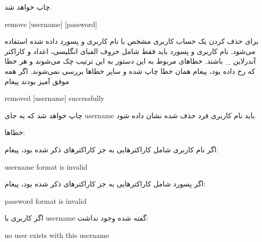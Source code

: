 \documentclass[]{article}
\begin{document}
چاپ خواهد شد.

\hrulefill




\begin{tcolorbox}[boxrule=0pt]
	\begin{latin}
  	  \large{
  	  	remove [username] [password]
		}
	\end{latin}
\end{tcolorbox}

برای حذف کردن یک حساب کاربری مشخص با نام کاربری و پسورد داده شده استفاده می‌شود. نام کاربری و پسورد باید فقط شامل حروف الفبای انگلیسی، اعداد و کاراکتر آندرلاین \_ باشند. خطاهای مربوط به این دستور به این ترتیب چک می‌شوند و هر خطا که رخ داده بود، پیغام همان خطا چاپ شده و سایر خطاها بررسی نمی‌شوند. اگر همه موفق آمیز بودند پیغام


\begin{tcolorbox}[boxrule=0pt]
	\begin{latin}
  	  \large{
  	  	removed [username] successfully
		}
	\end{latin}
\end{tcolorbox}

چاپ خواهد شد که به جای username باید نام کاربری فرد حذف شده نشان داده شود.

خطاها: 

اگر نام کاربری شامل کاراکترهایی به جز کاراکترهای ذکر شده بود، پیغام:



\begin{tcolorbox}[boxrule=0pt]
	\begin{latin}
  	  \large{
  	  	username format is invalid
		}
	\end{latin}
\end{tcolorbox}

اگر پسورد شامل کاراکترهایی به جز کاراکترهای ذکر شده بود، پیغام:


\begin{tcolorbox}[boxrule=0pt]
	\begin{latin}
  	  \large{
  	  	password format is invalid
		}
	\end{latin}
\end{tcolorbox}

اگر کاربری با username گفته شده وجود نداشت:


\begin{tcolorbox}[boxrule=0pt]
	\begin{latin}
  	  \large{
  	  	no user exists with this username
		}
	\end{latin}
\end{tcolorbox}
\end{document}
